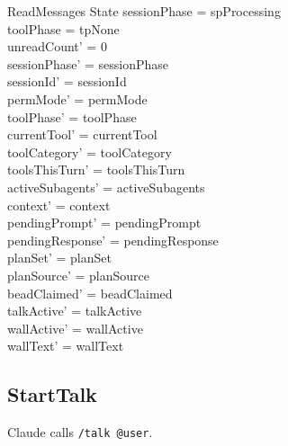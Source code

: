 \documentclass[a4paper,10pt,fleqn]{article}
\begin{document}
\begin{schema}{ReadMessages}
  \Delta State
  \where
  sessionPhase = spProcessing \\
  toolPhase = tpNone \\
  unreadCount' = 0 \\
  sessionPhase' = sessionPhase \\
  sessionId' = sessionId \\
  permMode' = permMode \\
  toolPhase' = toolPhase \\
  currentTool' = currentTool \\
  toolCategory' = toolCategory \\
  toolsThisTurn' = toolsThisTurn \\
  activeSubagents' = activeSubagents \\
  context' = context \\
  pendingPrompt' = pendingPrompt \\
  pendingResponse' = pendingResponse \\
  planSet' = planSet \\
  planSource' = planSource \\
  beadClaimed' = beadClaimed \\
  talkActive' = talkActive \\
  wallActive' = wallActive \\
  wallText' = wallText
\end{schema}

\subsection{StartTalk}

Claude calls \texttt{/talk @user}.
\end{document}
